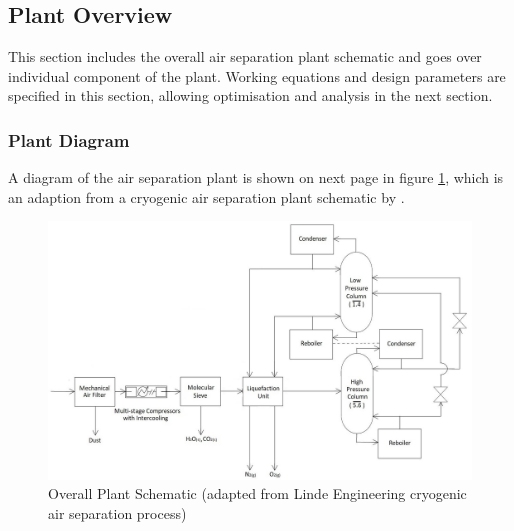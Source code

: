 \subsection{Plant Overview} \noindent
This section includes the overall air separation plant schematic and goes over individual component of the plant. Working equations and design parameters are specified in this section, allowing optimisation and analysis in the next section.
	\subsubsection{Plant Diagram} \noindent
    A diagram of the air separation plant is shown on next page in figure \ref{plant_diagram}, which is an adaption from a cryogenic air separation plant schematic by \cite{linde_cryo}.
    \begin{figure}
        \centering
	    \includegraphics[width=\linewidth]{plant_diagram.jpg}
        \caption{Overall Plant Schematic (adapted from Linde Engineering cryogenic air separation process)}
	    \label{plant_diagram}
    \end{figure}

